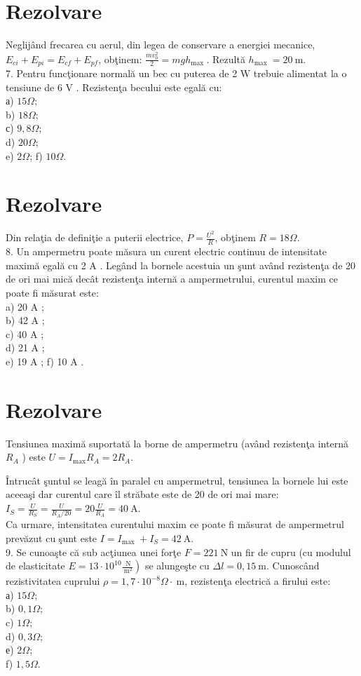 \section*{Rezolvare}
Neglijând frecarea cu aerul, din legea de conservare a energiei mecanice, $E_{c i}+E_{p i}=E_{c f}+E_{p f}$, obţinem: $\frac{m v_{0}^{2}}{2}=m g h_{\text {max }}$. Rezultă $h_{\text {max }}=20 \mathrm{~m}$.\\
7. Pentru funcţionare normală un bec cu puterea de 2 W trebuie alimentat la o tensiune de 6 V . Rezistenţa becului este egală cu:\\
а) $15 \Omega$;\\
b) $18 \Omega$;\\
с) $9,8 \Omega$;\\
d) $20 \Omega$;\\
e) $2 \Omega$; f) $10 \Omega$.

\section*{Rezolvare}
Din relaţia de definiţie a puterii electrice, $P=\frac{U^{2}}{R}$, obţinem $R=18 \Omega$.\\
8. Un ampermetru poate măsura un curent electric continuu de intensitate maximă egală cu 2 A . Legând la bornele acestuia un şunt având rezistenţa de 20 de ori mai mică decât rezistenţa internă a ampermetrului, curentul maxim ce poate fi măsurat este:\\
a) 20 A ;\\
b) 42 A ;\\
c) 40 A ;\\
d) 21 A ;\\
e) 19 A ; f) 10 A .

\section*{Rezolvare}
Tensiunea maximă suportată la borne de ampermetru (având rezistenţa internă $R_{A}$ ) este $U=I_{\max } R_{A}=2 R_{A}$.

Întrucât şuntul se leagă în paralel cu ampermetrul, tensiunea la bornele lui este aceeaşi dar curentul care îl străbate este de 20 de ori mai mare:\\
$I_{S}=\frac{U}{R_{S}}=\frac{U}{R_{A} / 20}=20 \frac{U}{R_{A}}=40 \mathrm{~A}$.\\
Ca urmare, intensitatea curentului maxim ce poate fi măsurat de ampermetrul prevăzut cu şunt este $I=I_{\text {max }}+I_{S}=42 \mathrm{~A}$.\\
9. Se cunoaşte că sub acţiunea unei forţe $F=221 \mathrm{~N}$ un fir de cupru (cu modulul de elasticitate $\left.E=13 \cdot 10^{10} \frac{\mathrm{~N}}{\mathrm{~m}^{2}}\right)$ se alungeşte cu $\Delta l=0,15 \mathrm{~m}$. Cunoscând rezistivitatea cuprului $\rho=1,7 \cdot 10^{-8} \Omega \cdot \mathrm{~m}$, rezistenţa electrică a firului este:\\
а) $15 \Omega$;\\
b) $0,1 \Omega$;\\
c) $1 \Omega$;\\
d) $0,3 \Omega$;\\
е) $2 \Omega$;\\
f) $1,5 \Omega$.

